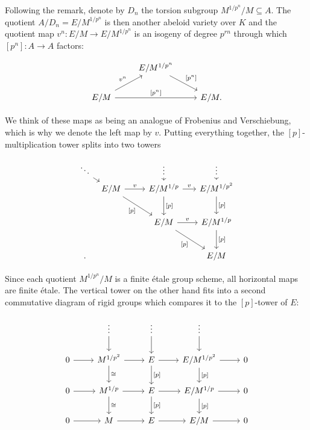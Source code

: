 \documentclass[10pt,oneside]{amsart}
\theoremstyle{definition}
\begin{document}
	Following the remark, denote by $D_n$ the torsion subgroup $M^{1/p^n}/M\subseteq A$. The quotient $A/D_n = E/M^{1/p^n}$ is then another abeloid variety over $K$ and the quotient map $v^n:E/M\rightarrow E/M^{1/p^n}$ is an isogeny of degree $p^{rn}$  through which  $[p^n]:A\rightarrow A$ factors: 
		\begin{center}
			\begin{equation}\label{factorisation of [p] over E/M}
			\begin{tikzcd}
				& E/M^{1/p^n} \arrow[rd, "{[p^n]}"] &  \\
				E/M \arrow[rr, "{[p^n]}"] \arrow[ru,"v^n"] &  & E/M.
			\end{tikzcd}
			\end{equation}
		\end{center}
		We think of these maps as being an analogue of Frobenius and Verschiebung, which is why we denote the left map by $v$.
		Putting everything together, the $[p]$-multiplication tower splits into two towers
		\begin{center}
		\begin{equation}\label{p-multiplication tower of E/M splits into vertical and horizontal tower}
		\begin{tikzcd}[column sep={1.1cm,between origins},row sep={0.7cm,between origins}]
			\ddots \arrow[rd] &  &  & \vdots \arrow[d] &  & \vdots \arrow[d] \\
			& E/M \arrow[rr,"v"] \arrow[rrdd, "{[p]}"'] &  & E/M^{1/p} \arrow[rr,"v"] \arrow[dd,"{[p]}"] &  & E/M^{1/p^2} \arrow[dd,"{[p]}"] \\
			&  &  &  &  &  \\
			&  &  & E/M \arrow[rrdd, "{[p]}"'] \arrow[rr,"v"] &  & E/M^{1/p} \arrow[dd,"{[p]}"] \\
			&  &  &  &  &  \\.
			&  &  &  &  & E/M
		\end{tikzcd}
		\end{equation}
		\end{center}
		Since each quotient $M^{1/p^n}/M$ is a finite \'etale group scheme, all horizontal maps are finite \'etale. The vertical tower on the other hand fits into a second commutative diagram of rigid groups which compares it to the $[p]$-tower of $E$:
		
		\begin{center}
		\begin{equation}\label{F-tower for E/M}
		\begin{tikzcd}
			& \vdots \arrow[d] & \vdots \arrow[d] & \vdots \arrow[d] &  \\
			0 \arrow[r] & M^{1/p^2} \arrow[d, "\cong"] \arrow[r] & E \arrow[d, "{[p]}"] \arrow[r] & E/M^{1/p^2} \arrow[d, "{[p]}"] \arrow[r] & 0 \\
			0 \arrow[r] & M^{1/p} \arrow[d, "\cong"] \arrow[r] & E \arrow[d, "{[p]}"] \arrow[r] & E/M^{1/p} \arrow[d, "{[p]}"] \arrow[r] & 0 \\
			0 \arrow[r] & M \arrow[r] & E \arrow[r] & E/M \arrow[r] & 0
		\end{tikzcd}
		\end{equation}
		\end{center}
		
\end{document}
